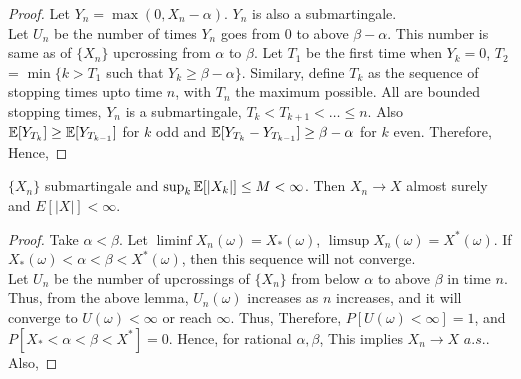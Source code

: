 \documentclass[all-lectures.tex]{subfiles}
\begin{document}
\begin{proof}
Let $Y_n = \max(0, X_n - \alpha)$. $Y_n$ is also a submartingale.\\
Let $U_n$ be the number of times $Y_n$ goes from 0 to above $\beta-\alpha$. 
This number is same as of $\{X_n\}$ upcrossing from $\alpha$ to $\beta$.
Let $T_1$ be the first time when $Y_k = 0$, $T_2$ = $\min \{k > T_1$ such that $Y_k \ge \beta - \alpha\}$. Similary, define $T_k$ as the sequence of stopping times upto time $n$, with $T_n$  the maximum possible.
All are bounded stopping times, $Y_n$ is a submartingale, $T_k < T_{k+1} < \dots \le n$.
Also $\mathbb{E}[Y_{T_k}] \ge \mathbb{E}[Y_{T_{k-1}}]$ for $k$ odd and $\mathbb{E}[Y_{T_k}-Y_{T_{k-1}}] \ge \beta-\alpha$ for $k$ even.
Therefore,
Hence,
\end{proof}
\begin{thm}
$\{X_n\}$ submartingale and $\sup_k \mathbb{E}[|X_k|] \le M < \infty$.
Then $X_n \to X$ almost surely and $E[|X|] < \infty$.
\end{thm}
\begin{proof}
Take $\alpha < \beta$. 
Let $\liminf X_n(\omega) = X_*(\omega)$, $\limsup X_n(\omega) = X^*(\omega)$. If $X_*(\omega) < \alpha < \beta < X^*(\omega)$, then this sequence will not converge.\\

Let $U_n$ be the number of upcrossings of $\{X_n\}$ from below $\alpha$ to above $\beta$ in time $n$.
Thus, from the above lemma,
$U_n(\omega)$ increases as $n$ increases, and it will converge to $U(\omega) < \infty$ or reach $\infty$.
Thus,
Therefore, $P[U(\omega) < \infty] = 1$, and $ P[X_* < \alpha <  \beta < X^*] = 0$.
Hence, for rational $\alpha, \beta$,
This implies
$X_n \to X$ \quad $a.s.$. Also,
\end{proof}
\end{document}
